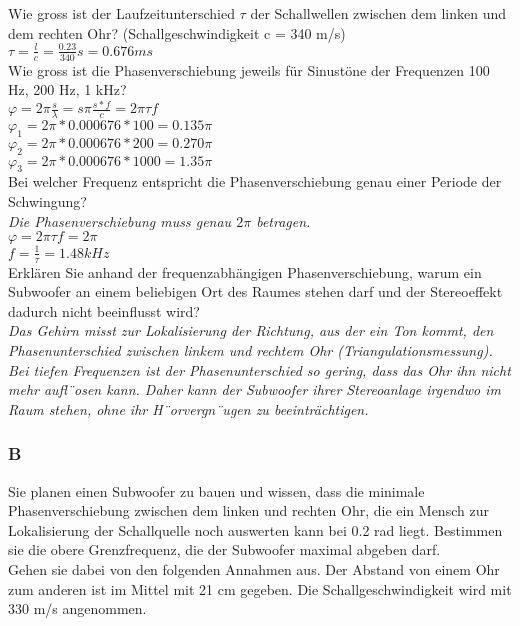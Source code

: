 Wie gross ist der Laufzeitunterschied $\tau$ der Schallwellen zwischen dem linken und dem rechten Ohr? (Schallgeschwindigkeit c = 340 m/s)\\
$\tau =\frac{l}{c}=\frac{0.23}{340}s=0.676ms$\\

Wie gross ist die Phasenverschiebung jeweils für Sinustöne der Frequenzen 100 Hz, 200 Hz, 1 kHz?\\
$\varphi =2\pi \frac{s}{\lambda }=s\pi \frac{s*f}{c}=2\pi \tau f$\\
$\varphi_1=2\pi * 0.000676*100=0.135\pi$\\
$\varphi_2=2\pi * 0.000676*200=0.270\pi$\\
$\varphi_3=2\pi * 0.000676*1000=1.35\pi$\\

Bei welcher Frequenz entspricht die Phasenverschiebung genau einer Periode der Schwingung?\\
\textit{Die Phasenverschiebung muss genau $2\pi$ betragen.}\\
$\varphi = 2\pi \tau f = 2\pi$\\
$f=\frac{1}{\tau}=1.48kHz$\\

Erklären Sie anhand der frequenzabhängigen Phasenverschiebung, warum ein Subwoofer an einem beliebigen Ort des Raumes stehen darf und der Stereoeffekt dadurch nicht beeinflusst wird?\\
\textit{Das Gehirn misst zur Lokalisierung der Richtung, aus der ein Ton kommt, den Phasenunterschied zwischen linkem und rechtem Ohr (Triangulationsmessung). Bei tiefen Frequenzen ist der Phasenunterschied so gering, dass das Ohr ihn nicht mehr aufl¨osen kann. Daher kann der Subwoofer ihrer Stereoanlage irgendwo im Raum stehen, ohne ihr H¨orvergn¨ugen zu beeinträchtigen.}

\subsubsection{B}
Sie planen einen Subwoofer zu bauen und wissen, dass die minimale Phasenverschiebung zwischen dem linken und rechten Ohr, die ein Mensch zur Lokalisierung der Schallquelle noch auswerten kann bei 0.2 rad liegt.
Bestimmen sie die obere Grenzfrequenz, die der Subwoofer maximal abgeben darf.\\

Gehen sie dabei von den folgenden Annahmen aus. Der Abstand von einem Ohr zum anderen ist  im Mittel mit 21 cm gegeben. Die Schallgeschwindigkeit wird mit 330 m/s angenommen.\\

